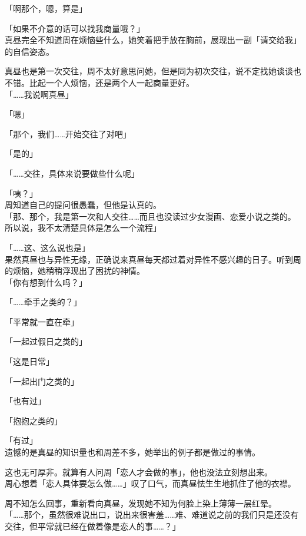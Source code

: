 「啊那个，嗯，算是」

「如果不介意的话可以找我商量哦？」\\

真昼完全不知道周在烦恼些什么，她笑着把手放在胸前，展现出一副「请交给我」的自信姿态。

真昼也是第一次交往，周不太好意思问她，但是同为初次交往，说不定找她谈谈也不错。比起一个人烦恼，还是两个人一起商量更好。\\

「……我说啊真昼」

「嗯」

「那个，我们……开始交往了对吧」

「是的」

「……交往，具体来说要做些什么呢」

「咦？」\\

周知道自己的提问很愚蠢，但他是认真的。\\

「那、那个，我是第一次和人交往……而且也没读过少女漫画、恋爱小说之类的。所以说，我不太清楚具体是怎么一个流程」

「……这、这么说也是」\\

果然真昼也与异性无缘，正确说来真昼每天都过着对异性不感兴趣的日子。听到周的烦恼，她稍稍浮现出了困扰的神情。\\

「你有想到什么吗？」

「……牵手之类的？」

「平常就一直在牵」

「一起过假日之类的」

「这是日常」

「一起出门之类的」

「也有过」

「抱抱之类的」

「有过」\\

遗憾的是真昼的知识量也和周差不多，她举出的例子都是做过的事情。

这也无可厚非。就算有人问周「恋人才会做的事」，他也没法立刻想出来。\\

周心想着「恋人具体要怎么做……」叹了口气，而真昼怯生生地抓住了他的衣襟。

周不知怎么回事，重新看向真昼，发现她不知为何脸上染上薄薄一层红晕。\\

「……那个，虽然很难说出口，说出来很害羞……难、难道说之前的我们只是还没有交往，但平常就已经在做着像是恋人的事……？」\\

